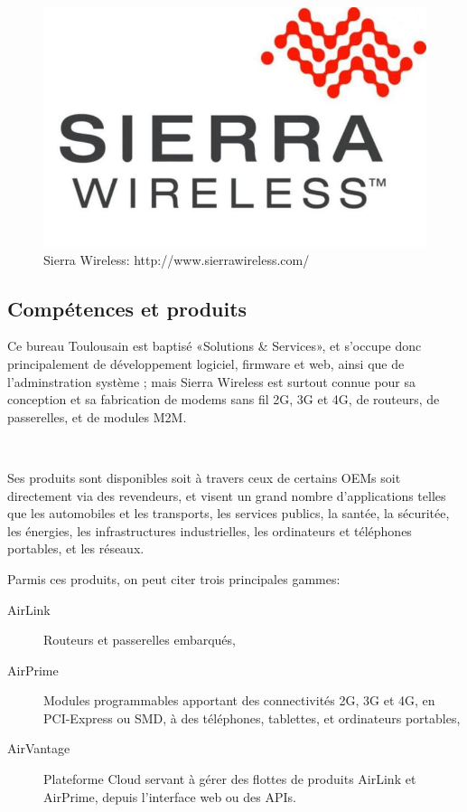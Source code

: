 \documentclass{article}
\begin{document}
\begin{figure}[h!]
    \centering\includegraphics[width=\linewidth/2]{img/swir.jpg}
    \caption{Sierra Wireless: http://www.sierrawireless.com/}
\end{figure}

\subsection{Compétences et produits}

Ce bureau Toulousain est baptisé «Solutions \& Services», et s’occupe donc principalement de développement logiciel, firmware et web, ainsi que de l’adminstration système ; mais Sierra Wireless est surtout connue pour sa conception et sa fabrication de modems sans fil 2G, 3G et 4G, de routeurs, de passerelles, et de modules M2M.

~

Ses produits sont disponibles soit à travers ceux de certains OEMs soit directement via des revendeurs, et visent un grand nombre d’applications telles que les automobiles et les transports, les services publics, la santée, la sécuritée, les énergies, les infrastructures industrielles, les ordinateurs et téléphones portables, et les réseaux.

Parmis ces produits, on peut citer trois principales gammes:

\begin{description}
    \item[AirLink] Routeurs et passerelles embarqués,
    \item[AirPrime] Modules programmables apportant des connectivités 2G, 3G et 4G, en PCI-Express ou SMD, à des téléphones, tablettes, et ordinateurs portables,
    \item[AirVantage] Plateforme Cloud servant à gérer des flottes de produits AirLink et AirPrime, depuis l’interface web ou des APIs.
\end{description}
\end{document}
